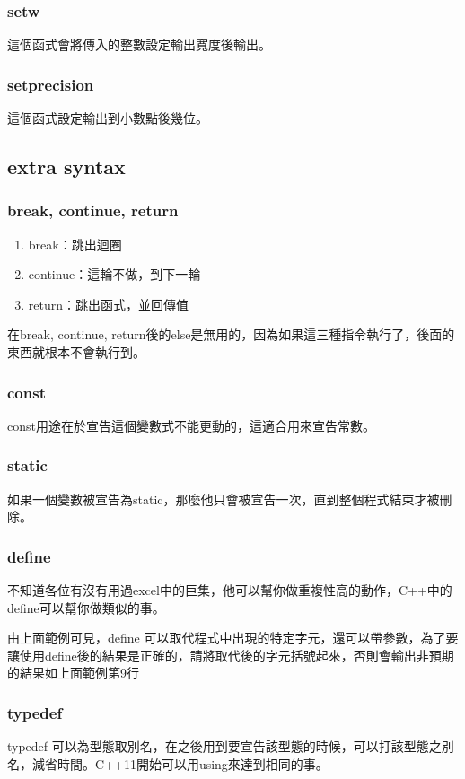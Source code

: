 \subsubsection{setw}
這個函式會將傳入的整數設定輸出寬度後輸出。

\subsubsection{setprecision}
這個函式設定輸出到小數點後幾位。

\subsection{extra syntax}
\subsubsection{break, continue, return}
\begin{enumerate}
\item break：跳出迴圈
\item continue：這輪不做，到下一輪
\item return：跳出函式，並回傳值
\end{enumerate}
在break, continue, return後的else是無用的，因為如果這三種指令執行了，後面的東西就根本不會執行到。
\subsubsection{const}
const用途在於宣告這個變數式不能更動的，這適合用來宣告常數。

\subsubsection{static}
如果一個變數被宣告為static，那麼他只會被宣告一次，直到整個程式結束才被刪除。

\subsubsection{define}
不知道各位有沒有用過excel中的巨集，他可以幫你做重複性高的動作，C++中的define可以幫你做類似的事。

由上面範例可見，define 可以取代程式中出現的特定字元，還可以帶參數，為了要讓使用define後的結果是正確的，請將取代後的字元括號起來，否則會輸出非預期的結果如上面範例第9行

\subsubsection{typedef}
typedef 可以為型態取別名，在之後用到要宣告該型態的時候，可以打該型態之別名，減省時間。C++11開始可以用using來達到相同的事。

